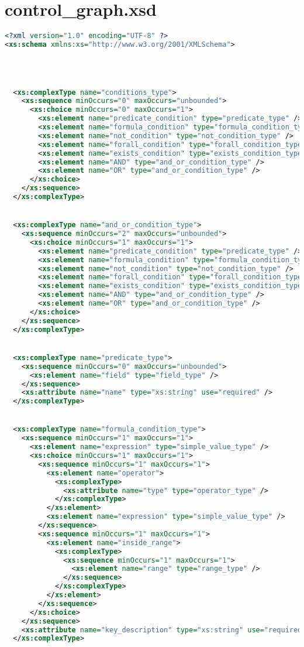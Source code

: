 \section{  control_graph.xsd}\label{Appendix_2_2} 
\begin{lstlisting}[style=stylexml,language=XML]
<?xml version="1.0" encoding="UTF-8" ?>
<xs:schema xmlns:xs="http://www.w3.org/2001/XMLSchema">




  <xs:complexType name="conditions_type">
    <xs:sequence minOccurs="0" maxOccurs="unbounded">
      <xs:choice minOccurs="0" maxOccurs="1">
        <xs:element name="predicate_condition" type="predicate_type" />
        <xs:element name="formula_condition" type="formula_condition_type" />
        <xs:element name="not_condition" type="not_condition_type" />
        <xs:element name="forall_condition" type="forall_condition_type" />
        <xs:element name="exists_condition" type="exists_condition_type" />
        <xs:element name="AND" type="and_or_condition_type" />
        <xs:element name="OR" type="and_or_condition_type" />
      </xs:choice>
    </xs:sequence>
  </xs:complexType>


  <xs:complexType name="and_or_condition_type">
    <xs:sequence minOccurs="2" maxOccurs="unbounded">
      <xs:choice minOccurs="1" maxOccurs="1">
        <xs:element name="predicate_condition" type="predicate_type" />
        <xs:element name="formula_condition" type="formula_condition_type" />
        <xs:element name="not_condition" type="not_condition_type" />
        <xs:element name="forall_condition" type="forall_condition_type" />
        <xs:element name="exists_condition" type="exists_condition_type" />
        <xs:element name="AND" type="and_or_condition_type" />
        <xs:element name="OR" type="and_or_condition_type" />
      </xs:choice>
    </xs:sequence>
  </xs:complexType>


  <xs:complexType name="predicate_type">
    <xs:sequence minOccurs="0" maxOccurs="unbounded">
      <xs:element name="field" type="field_type" />
    </xs:sequence>
    <xs:attribute name="name" type="xs:string" use="required" />
  </xs:complexType>


  <xs:complexType name="formula_condition_type">
    <xs:sequence minOccurs="1" maxOccurs="1">
      <xs:element name="expression" type="simple_value_type" />
      <xs:choice minOccurs="1" maxOccurs="1">
        <xs:sequence minOccurs="1" maxOccurs="1">
          <xs:element name="operator">
            <xs:complexType>
              <xs:attribute name="type" type="operator_type" />
            </xs:complexType>
          </xs:element>
          <xs:element name="expression" type="simple_value_type" />
        </xs:sequence>
        <xs:sequence minOccurs="1" maxOccurs="1">
          <xs:element name="inside_range">
            <xs:complexType>
              <xs:sequence minOccurs="1" maxOccurs="1">
                <xs:element name="range" type="range_type" />
              </xs:sequence>
            </xs:complexType>
          </xs:element>
        </xs:sequence>
      </xs:choice>
    </xs:sequence>
    <xs:attribute name="key_description" type="xs:string" use="required" />
  </xs:complexType>



\end{lstlisting}
